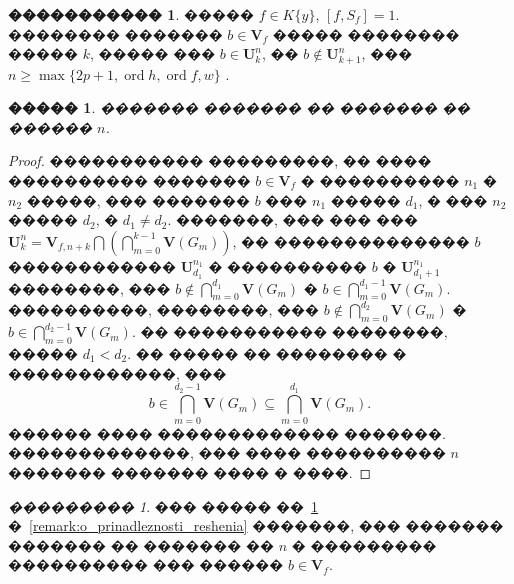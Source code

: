 \documentclass[16pt]{article}
\DeclareMathOperator{\ord}{ord}
\theoremstyle{plain}
\newtheorem{lemma}[theorem]{�����}
\theoremstyle{definition}
\newtheorem{definition}[theorem]{�����������}
\theoremstyle{remark}
\newtheorem{remark}[theorem]{���������}
\begin{document}
\begin{definition}
����� $f\in K\{y\}$, $[f,S_f]=1$.  �������� ������� $b\in \mathbf{V}_f$  ����� �������� ����� $k$, ����� ��� $b\in \mathbf{U}_k^n$, �� $b\not\in \mathbf{U}_{k+1}^n$, ��� $n \geqslant\max\{ 2p+1,\ord{h},\ord{f},w\}$ .
\end{definition}



\begin{lemma}\label{lemma:o_nasledovanii}
������� ������� �� ������� �� ������ $n$.

\end{lemma}

\begin{proof}
����������� ���������, �� ���� ���������� ������� $b\in\mathbf{V}_f$ � ���������� $n_1$ � $n_2$ �����, ���  ������� $b$ ��� $n_1$  ����� $d_1$, � ��� $n_2$ ����� $d_2$, � $d_1\not=d_2$. �������, ��� ��� ��� $\mathbf{U}_k^n=\mathbf{V}_{f,n+k}\bigcap\left(\bigcap\limits_{m=0}^{k-1}\mathbf{V}\left(G_m\right)\right)$, �� �������������� $b$  ������������ $\mathbf{U}_{d_1}^{n_1}$ � ���������� $b$ � $\mathbf{U}_{d_1+1}^{n_1}$ ��������, ��� $b\not\in\bigcap\limits_{m=0}^{d_1}\mathbf{V}\left(G_m\right)$ � $b\in\bigcap\limits_{m=0}^{d_1-1}\mathbf{V}\left(G_m\right)$. ����������, ��������, ��� $b\not\in\bigcap\limits_{m=0}^{d_2}\mathbf{V}\left(G_m\right)$ � $b\in\bigcap\limits_{m=0}^{d_2-1}\mathbf{V}\left(G_m\right)$. �� ����������� ��������, ����� $d_1<d_2$. �� ����� �� �������� � ������������, ��� 
$$
b\in\bigcap\limits_{m=0}^{d_2-1}\mathbf{V}\left(G_m\right)\subseteq\bigcap\limits_{m=0}^{d_1}\mathbf{V}\left(G_m\right).
$$
������ ���� ������������� �������. �������������, ��� ����  ���������� $n$ ������� ������� ���� � ����.

\end{proof}

\begin{remark}\label{remark:o_sushestvovanii_gllubiny} ��� ����� ��~\ref{lemma:o_nasledovanii} �~\ref{remark:o_prinadleznosti_reshenia} �������, ��� ������� ������� �� ������� �� $n$ � ��������� ���������� ��� ������ $b\in \mathbf{V}_f$.
\end{remark}
\end{document}
